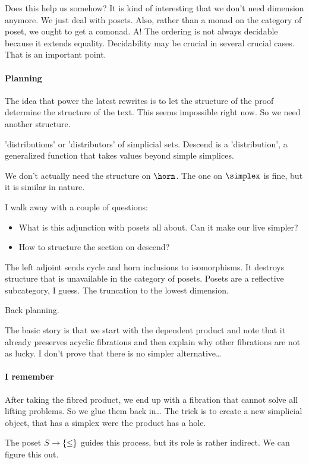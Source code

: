 \documentclass[csh.tex]{subfiles}
\begin{document}
Does this help us somehow? It is kind of interesting that we don't need dimension anymore. We just deal with posets. Also, rather than a monad on the category of poset, we ought to get a comonad.
A! The ordering is not always decidable because it extends equality. Decidability may be crucial in several crucial cases. That is an important point.

\paragraph{Planning}
The idea that power the latest rewrites is to let the structure of the proof determine the structure of the text. This seems impossible right now. So we need another structure.

'distributions' or 'distributors' of simplicial sets. Descend is a 'distribution', a generalized function that takes values beyond simple simplices.

We don't actually need the structure on $\horn$. The one on $\simplex$ is fine, but it is similar in nature.

I walk away with a couple of questions:
\begin{itemize}
\item What is this adjunction with posets all about. Can it make our live simpler?
\item How to structure the section on descend?
\end{itemize}

The left adjoint sends cycle and horn inclusions to isomorphisms. It destroys structure that is unavailable in the category of posets.
Posets are a reflective subcategory, I guess. The truncation to the lowest dimension.

Back planning.

The basic story is that we start with the dependent product and note that it already preserves acyclic fibrations and then explain why other fibrations are not as lucky. I don't prove that there is no simpler alternative\dots

\paragraph{I remember}
After taking the fibred product, we end up with a fibration that cannot solve all lifting problems. So we glue them back in\dots
The trick is to create a new simplicial object, that has a simplex were the product has a hole.

The poset $S\to\left\{\leq\right\}$ guides this process, but its role is rather indirect. We can figure this out.
\end{document}
